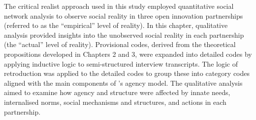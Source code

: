 The critical realist approach used in this study employed quantitative social network analysis to observe social reality in three open innovation partnerships (referred to as the \enquote{empirical} level of reality). In this chapter, qualitative analysis provided insights into the unobserved social reality in each partnership (the \enquote{actual} level of reality). Provisional codes, derived from the theoretical propositions developed in Chapters 2 and 3, were expanded into detailed codes by applying inductive logic to semi-structured interview transcripts. The logic of retroduction was applied to the detailed codes to group these into category codes aligned with the main components of \citet{loyal2001agency}'s agency model. The qualitative analysis aimed to examine how agency and structure were affected by innate needs, internalised norms, social mechanisms and structures, and actions in each partnership. \medskip

